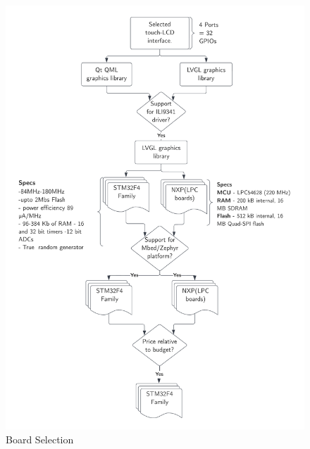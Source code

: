 \begin{figure}[H]
    \centering
    \includegraphics[width=\textwidth,height=\textheight, keepaspectratio]{Figures/BoardSelection.png}
    \caption{Board Selection}
    \label{fig:mcu selection}
\end{figure}

